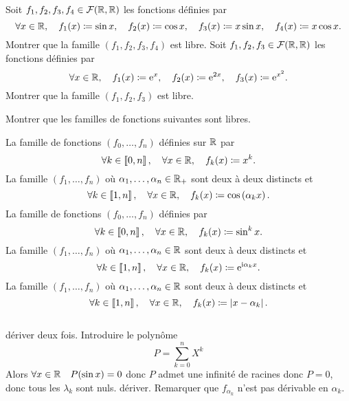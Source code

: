 \documentclass{magnolia}
\begin{document}

\begin{questions}
\question
Soit $f_1,f_2,f_3,f_4\in\mathcal{F}(\mathbb{R},\mathbb{R})$ les fonctions définies par
\[\forall x\in\mathbb{R},\quad f_1(x)\coloneqq\sin x,\quad f_2(x)\coloneqq \cos x,\quad f_3(x)\coloneqq x\sin x,\quad f_4(x)\coloneqq x\cos x.\]
Montrer que la famille $(f_1,f_2,f_3,f_4)$ est libre.
\question Soit $f_1,f_2,f_3\in\mathcal{F}(\mathbb{R},\mathbb{R})$ les fonctions définies par
\[\forall x\in\mathbb{R},\quad f_1(x)\coloneqq {\rm e}^x,\quad f_2(x)\coloneqq {\rm e}^{2x},\quad f_3(x)\coloneqq {\rm e}^{x^2}.\]
Montrer que la famille $(f_1,f_2,f_3)$ est libre.
\end{questions}


Montrer que les familles de fonctions suivantes sont libres.
\begin{questions}
\question La famille de fonctions $(f_0,\ldots,f_n)$ définies sur $\mathbb{R}$ par
  \[\forall k\in\left\llbracket 0,n\right\rrbracket ,\quad \forall x\in\mathbb{R} ,\quad f_k(x)\coloneqq x^k.\]
\question La famille $(f_{1},\ldots,f_{n})$
  où $\alpha_1,\ldots,\alpha_n\in\mathbb{R}_+$ sont deux à deux distincts et
  \[\forall k\in\left\llbracket 1,n\right\rrbracket ,\quad \forall x\in\mathbb{R} ,\quad
    f_k(x)\coloneqq \cos\left(\alpha_k x\right).\]
\question La famille de fonctions $(f_0,\ldots,f_n)$ définies par
  \[\forall k\in\left\llbracket 0,n\right\rrbracket ,\quad \forall x\in\mathbb{R} ,\quad f_k(x)\coloneqq \sin^k x.\]
\question La famille $(f_1,\ldots,f_n)$ où
  $\alpha_1,\ldots,\alpha_n\in\mathbb{R}$ sont deux à deux distincts et
  \[\forall k\in\left\llbracket 1,n\right\rrbracket ,\quad \forall x\in\mathbb{R} ,\quad
    f_{k}(x)\coloneqq {\rm e}^{{\rm i} \alpha_k x}.\]
\question La famille $(f_{1},\ldots,f_{n})$ où
  $\alpha_1,\ldots,\alpha_n\in\mathbb{R}$ sont deux à deux distincts et
  \[\forall k\in\left\llbracket 1,n\right\rrbracket ,\quad \forall x\in\mathbb{R} ,\quad
    f_{k}(x)\coloneqq\left|x-\alpha_k\right|.\]
\end{questions}
\begin{sol}
$\quad$
\begin{questions}
\question   
\question dériver deux fois.
\question Introduire le polynôme
  \[P=\sum_{k=0}^n X^k\]
  Alors $\forall x\in\mathbb{R} \quad P(\sin x)=0$ donc $P$ admet une infinité de
  racines donc $P=0$, donc tous les $\lambda_k$ sont nuls.
\question dériver.
\question Remarquer que $f_{\alpha_k}$ n'est pas dérivable en $\alpha_k$.
\end{questions}
\end{sol}
\end{document}
